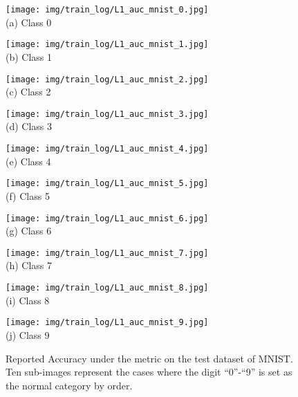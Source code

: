 \documentclass[journal]{IEEEtran}
\begin{document}
\begin{figure}[!h]
\centering
\begin{minipage}[t]{0.24\textwidth}
\centering
\texttt{[image: img/train\_log/L1\_auc\_mnist\_0.jpg]}\\
(a) Class 0
\end{minipage}
\begin{minipage}[t]{0.24\textwidth}
\centering
\texttt{[image: img/train\_log/L1\_auc\_mnist\_1.jpg]}\\
(b) Class 1
\end{minipage}
\begin{minipage}[t]{0.24\textwidth}
\centering
\texttt{[image: img/train\_log/L1\_auc\_mnist\_2.jpg]}\\
(c) Class 2
\end{minipage}
\begin{minipage}[t]{0.24\textwidth}
\centering
\texttt{[image: img/train\_log/L1\_auc\_mnist\_3.jpg]}\\
(d) Class 3
\end{minipage}
\begin{minipage}[t]{0.24\textwidth}
\centering
\texttt{[image: img/train\_log/L1\_auc\_mnist\_4.jpg]}\\
(e) Class 4
\end{minipage}
\begin{minipage}[t]{0.24\textwidth}
\centering
\texttt{[image: img/train\_log/L1\_auc\_mnist\_5.jpg]}\\
(f) Class 5
\end{minipage}
\begin{minipage}[t]{0.24\textwidth}
\centering
\texttt{[image: img/train\_log/L1\_auc\_mnist\_6.jpg]}\\
(g) Class 6
\end{minipage}
\begin{minipage}[t]{0.24\textwidth}
\centering
\texttt{[image: img/train\_log/L1\_auc\_mnist\_7.jpg]}\\
(h) Class 7
\end{minipage}
\begin{minipage}[t]{0.24\textwidth}
\centering
\texttt{[image: img/train\_log/L1\_auc\_mnist\_8.jpg]}\\
(i) Class 8
\end{minipage}
\begin{minipage}[t]{0.24\textwidth}
\centering
\texttt{[image: img/train\_log/L1\_auc\_mnist\_9.jpg]}\\
(j) Class 9
\end{minipage}
\caption{Reported Accuracy under the  metric on the test dataset of MNIST\cite{lecun1998mnist}. Ten sub-images represent the cases where the digit ``0''-``9'' is set as the normal category by order.}
\label{fig:stable3}
\end{figure}
\end{document}
